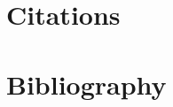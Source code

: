 \documentclass{article}
\let\cite\textcite
\begin{document}
\section{Citations}

\cite{001}

\cite{002}

\section{Bibliography}

\printbibliography
\end{document}
